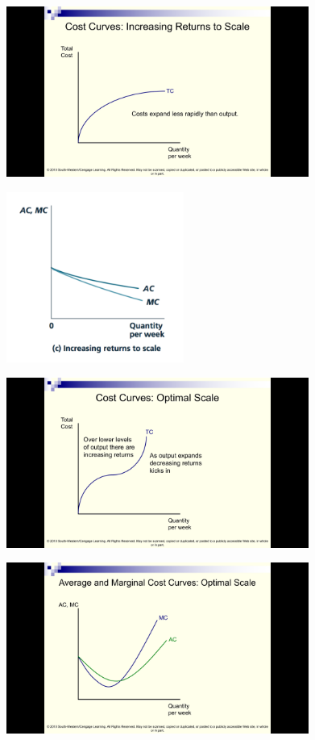 \documentclass[]{article}
\begin{document}
\includegraphics[height=2.2in]{picsfigs/irsTCcurve.png}

\includegraphics[height=2.2in]{picsfigs/irscosts_fix.png}

\includegraphics[height=2.2in]{picsfigs/mesTCcurve.png}

\includegraphics[height=2.2in]{picsfigs/mescostcurves}
\end{document}
